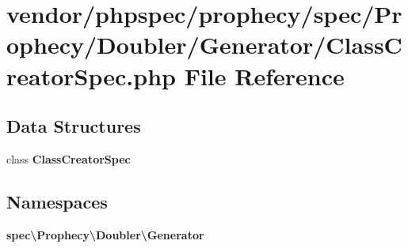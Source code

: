 \section{vendor/phpspec/prophecy/spec/\+Prophecy/\+Doubler/\+Generator/\+Class\+Creator\+Spec.php File Reference}
\label{_class_creator_spec_8php}
\subsection*{Data Structures}
\begin{DoxyCompactItemize}
\item 
class {\bf Class\+Creator\+Spec}
\end{DoxyCompactItemize}
\subsection*{Namespaces}
\begin{DoxyCompactItemize}
\item 
 {\bf spec\textbackslash{}\+Prophecy\textbackslash{}\+Doubler\textbackslash{}\+Generator}
\end{DoxyCompactItemize}
